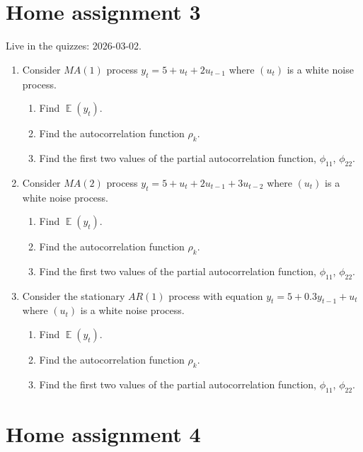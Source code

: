 \documentclass[12pt]{article}
\DeclareMathOperator{\E}{\mathbb{E}}
\begin{document}
\newpage
\section*{Home assignment 3}

Live in the quizzes: 2026-03-02.

\begin{enumerate}
    \item Consider $MA(1)$ process $y_t = 5 + u_t + 2u_{t-1}$ where $(u_t)$ is a white noise process.
    \begin{enumerate}
        \item Find $\E(y_t)$.
        \item Find the autocorrelation function $\rho_k$.
        \item Find the first two values of the partial autocorrelation function, $\phi_{11}$, $\phi_{22}$.
    \end{enumerate}

    \item Consider $MA(2)$ process $y_t = 5 + u_t + 2u_{t-1} + 3u_{t-2}$ where $(u_t)$ is a white noise process.
    \begin{enumerate}
        \item Find $\E(y_t)$.
        \item Find the autocorrelation function $\rho_k$.
        \item Find the first two values of the partial autocorrelation function, $\phi_{11}$, $\phi_{22}$.
    \end{enumerate}

    \item Consider the stationary $AR(1)$ process with equation $y_t = 5 + 0.3 y_{t-1} + u_t$ where $(u_t)$ is a white noise process.
    \begin{enumerate}
        \item Find $\E(y_t)$.
        \item Find the autocorrelation function $\rho_k$.
        \item Find the first two values of the partial autocorrelation function, $\phi_{11}$, $\phi_{22}$.
    \end{enumerate}

\end{enumerate}



\newpage
\section*{Home assignment 4}
\end{document}
